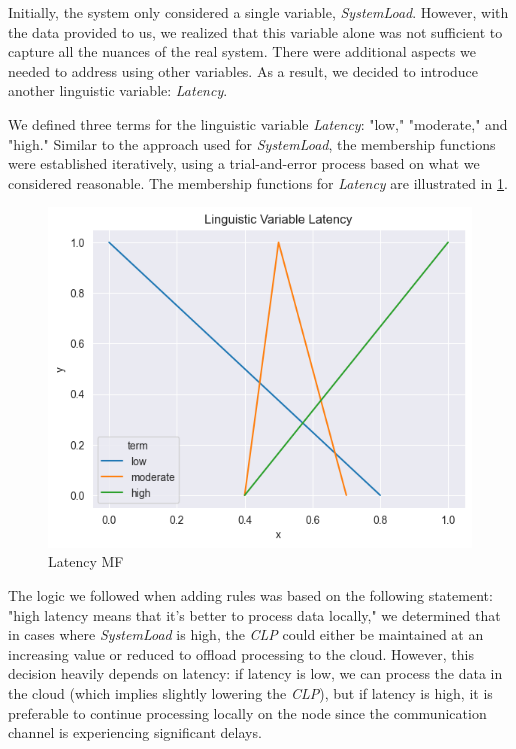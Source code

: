 \documentclass[titlepage]{article}
\begin{document}
\vspace{5mm}


Initially, the system only considered a single variable, \textit{SystemLoad}. However, with the data provided to us, we realized that this variable alone was not sufficient to capture all the nuances of the real system. There were additional aspects we needed to address using other variables. As a result, we decided to introduce another linguistic variable: \textit{Latency}.

We defined three terms for the linguistic variable \textit{Latency}: "low," "moderate," and "high." Similar to the approach used for \textit{SystemLoad}, the membership functions were established iteratively, using a trial-and-error process based on what we considered reasonable. The membership functions for \textit{Latency} are illustrated in \cref{fig:latency_triangular_v4}.

\begin{figure}[H]
    \centering
\includegraphics[scale = 0.6]{../images/triangular_v4_latency}
\caption{Latency MF}
\label{fig:latency_triangular_v4}
\end{figure}



The logic we followed when adding rules was based on the following statement: "high latency means that it’s better to process data locally," we determined that in cases where \textit{SystemLoad} is high, the \textit{CLP} could either be maintained at an increasing value or reduced to offload processing to the cloud. However, this decision heavily depends on latency: if latency is low, we can process the data in the cloud (which implies slightly lowering the \textit{CLP}), but if latency is high, it is preferable to continue processing locally on the node since the communication channel is experiencing significant delays.
\end{document}
